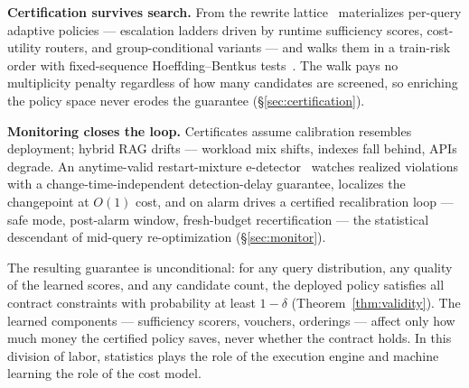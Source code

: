 \textbf{Certification survives search.} From the rewrite lattice
\system\ materializes per-query adaptive policies --- escalation ladders
driven by runtime sufficiency scores, cost-utility routers, and
group-conditional variants --- and walks them in a train-risk order with
fixed-sequence Hoeffding--Bentkus
tests~\cite{angelopoulos2021ltt,bentkus2004hoeffding}. The walk pays no
multiplicity penalty regardless of how many candidates are screened, so
enriching the policy space never erodes the guarantee
(\S\ref{sec:certification}).

\textbf{Monitoring closes the loop.} Certificates assume calibration
resembles deployment; hybrid RAG drifts --- workload mix shifts, indexes
fall behind, APIs degrade. An anytime-valid restart-mixture
e-detector~\cite{ramdas2023savi,shin2024edetectors} watches realized
violations with a change-time-independent detection-delay guarantee,
localizes the changepoint at $O(1)$ cost, and on alarm drives a
certified recalibration loop --- safe mode, post-alarm window,
fresh-budget recertification --- the statistical
descendant of mid-query re-optimization
\cite{kabra1998efficient,markl2004robust} (\S\ref{sec:monitor}).

The resulting guarantee is unconditional: for any query distribution,
any quality of the learned scores, and any candidate count, the deployed
policy satisfies all contract constraints with probability at least
$1-\delta$ (Theorem~\ref{thm:validity}). The learned components ---
sufficiency scorers, vouchers, orderings --- affect only how much money
the certified policy saves, never whether the contract holds. In this
division of labor, statistics plays the role of the execution engine and
machine learning the role of the cost model.

